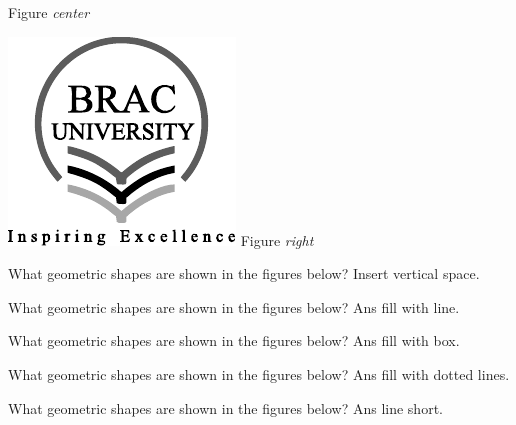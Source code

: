 \documentclass[12pt]{exam}
\begin{document}
\begin{questions}
\begin{minipage}[t]{0.3\textwidth}
    Figure \emph{center}
\end{minipage}\hfill
\begin{minipage}[t]{0.3\textwidth}
    \centering
    \includegraphics[width=\linewidth]{bracu_logo_ai.pdf}
    Figure \emph{right}
\end{minipage}

\question[3.5] What geometric shapes are shown in the figures below? Insert vertical space.

\vspace{2.5cm}
\question[3.5] What geometric shapes are shown in the figures below? Ans fill with line.

\fillwithlines{1in}

\question[3.5] What geometric shapes are shown in the figures below? Ans fill with box.

\makeemptybox{1in}

\question[3.5] What geometric shapes are shown in the figures below? Ans fill with dotted lines.

\fillwithdottedlines{1in}

\question[3.5] What geometric shapes are shown in the figures below? Ans line short. \answerline

\end{questions}
\printanswers
\end{document}
